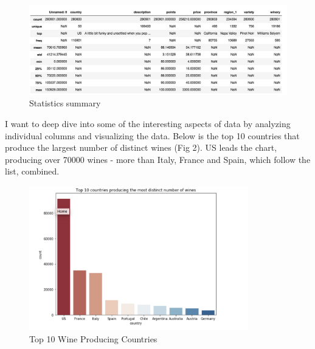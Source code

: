\documentclass{article}
\begin{document}
\begin{figure}[H]
\caption{Statistics summary}
\centering
\includegraphics[width=1.2\textwidth]{graphs/data_describe.png}
\end{figure}

I want to deep dive into some of the interesting aspects of data by analyzing individual columns and visualizing the data. Below is the top 10 countries that produce the largest number of distinct wines (Fig 2). US leads the chart, producing over 70000 wines - more than Italy, France and Spain, which follow the list, combined.

\begin{figure}[H]
\caption{Top 10 Wine Producing Countries}
\centering
\includegraphics[width=0.85\textwidth]{graphs/top_10_countries}
\end{figure}
\end{document}
